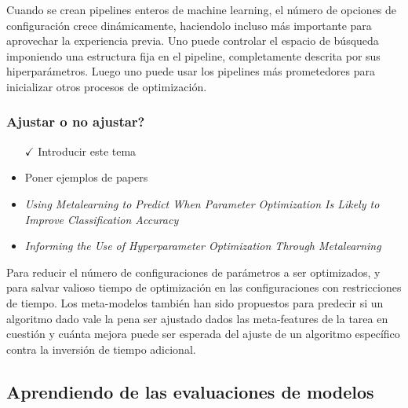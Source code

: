 \quad

Cuando se crean pipelines enteros de machine learning, el número de opciones de configuración crece dinámicamente, haciendolo incluso más importante para aprovechar la experiencia previa. Uno puede controlar el espacio de búsqueda imponiendo una estructura fija en el pipeline, completamente descrita por sus hiperparámetros. Luego uno puede usar los pipelines más prometedores para inicializar otros procesos de optimización.

\subsubsection{Ajustar o no ajustar?}

\begin{itemize}
	\item[$\checkmark$] Introducir este tema
	\item Poner ejemplos de papers
	\item \textit{Using Metalearning to Predict When Parameter Optimization Is Likely to Improve Classification Accuracy}
	\item \textit{Informing the Use of Hyperparameter Optimization Through Metalearning}
\end{itemize}

Para reducir el número de configuraciones de parámetros a ser optimizados, y para salvar valioso tiempo de optimización en las configuraciones con restricciones de tiempo. Los meta-modelos también han sido propuestos para predecir si un algoritmo dado vale la pena ser ajustado dados las meta-features de la tarea en cuestión y cuánta mejora puede ser esperada del ajuste de un algoritmo específico contra la inversión de tiempo adicional.

%

\subsection{Aprendiendo de las evaluaciones de modelos}\label{subsec:mtl_automl_evaluations}

